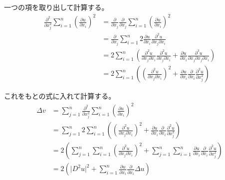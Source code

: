 \documentclass[12pt,b5paper]{ltjsarticle}
\begin{document}
\begin{enumerate}
\begin{enumerate}
            一つの項を取り出して計算する。
            \begin{align}
             \frac{\partial^{2}}{\partial x_{j}^{2}}
             \sum_{i=1}^{n} \left( \frac{\partial u}{\partial x_{i}} \right)^{2}
             &=
             \frac{\partial}{\partial x_{j}} \frac{\partial}{\partial x_{j}}
             \sum_{i=1}^{n} \left( \frac{\partial u}{\partial x_{i}} \right)^{2}\\
             &=
             \frac{\partial}{\partial x_{j}}
             \sum_{i=1}^{n} 2 \frac{\partial u}{\partial x_{i}}
             \frac{\partial^{2} u}{\partial x_{j} \partial x_{i}}\\
             &=
             2 \sum_{i=1}^{n} \left(
             \frac{\partial^{2} u}{\partial x_{j} \partial x_{i}}
             \frac{\partial^{2} u}{\partial x_{j} \partial x_{i}}
             +
             \frac{\partial u}{\partial x_{i}}
             \frac{\partial^{3} u}{\partial x_{j} \partial x_{j} \partial x_{i}}
             \right)\\
             &= 2 \sum_{i=1}^{n} \left(
             \left( \frac{\partial^{2} u}{\partial x_{j} \partial x_{i}} \right)^{2}
             + \frac{\partial u}{\partial x_{i}} \frac{\partial}{\partial x_{i}} \frac{\partial^{2} u}{\partial x_{j}^{2}}
             \right)
            \end{align}


            これをもとの式に入れて計算する。
            \begin{align}
             \Delta v
              &= \sum_{j=1}^{n} \frac{\partial^{2}}{\partial x_{j}^{2}}
                \sum_{i=1}^{n} \left( \frac{\partial u}{\partial x_{i}} \right)^{2}\\
              &= \sum_{j=1}^{n}
              2 \sum_{i=1}^{n} \left(
                \left( \frac{\partial^{2} u}{\partial x_{j} \partial x_{i}} \right)^{2}
                + \frac{\partial u}{\partial x_{i}} \frac{\partial}{\partial x_{i}} \frac{\partial^{2} u}{\partial x_{j}^{2}}
              \right)\\
              &= 2 \left(
             \sum_{j=1}^{n} \sum_{i=1}^{n} \left( \frac{\partial^{2} u}{\partial x_{j} \partial x_{i}} \right)^{2}
             + \sum_{j=1}^{n} \sum_{i=1}^{n} \frac{\partial u}{\partial x_{i}} \frac{\partial}{\partial x_{i}} \frac{\partial^{2} u}{\partial x_{j}^{2}}
             \right)\\
              &= 2 \left(
                \lvert D^{2}u \rvert^{2} + \sum_{i=1}^{n} \frac{\partial u}{\partial x_{i}} \frac{\partial}{\partial x_{i}} \Delta u
             \right)
            \end{align}


\end{enumerate}
\end{enumerate}
\end{document}

